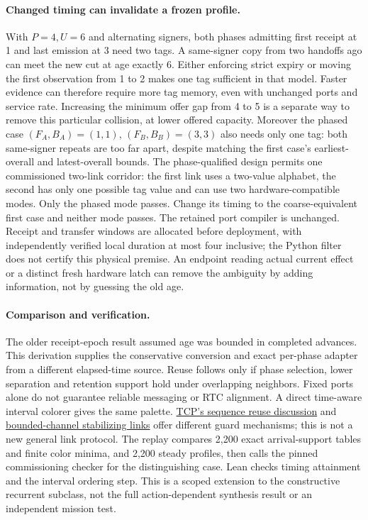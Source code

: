 \documentclass[11pt]{article}
\begin{document}
\paragraph{Changed timing can invalidate a frozen profile.}
With \(P=4,U=6\) and alternating signers, both phases
admitting first receipt at 1 and last emission at 3
need two tags. A same-signer copy from two handoffs ago
can meet the new cut at age exactly 6. Either enforcing
strict expiry or moving the first observation from 1 to
2 makes one tag sufficient in that model. Faster evidence
can therefore require more tag memory, even with unchanged
ports and service rate. Increasing the minimum offer gap from 4 to 5 is a
separate way to remove this particular collision, at lower offered capacity.
Moreover the phased case
\((F_A,B_A)=(1,1)\), \((F_B,B_B)=(3,3)\) also needs
only one tag: both same-signer repeats are too far apart,
despite matching the first case's earliest-overall and
latest-overall bounds. The phase-qualified design permits
one commissioned two-link corridor: the first link uses
a two-value alphabet, the second has only one possible
tag value and can use two hardware-compatible modes.
Only the phased mode passes. Change its timing to the
coarse-equivalent first case and neither mode passes.
The retained port compiler is unchanged. Receipt and
transfer windows are allocated before deployment, with
independently verified local duration at most four inclusive;
the Python filter does not certify this physical premise.
An endpoint reading actual current effect or a distinct
fresh hardware latch can remove the ambiguity by adding
information, not by guessing the old age.

\paragraph{Comparison and verification.}
The older receipt-epoch result assumed age was bounded
in completed advances. This derivation supplies the
conservative conversion and exact per-phase adapter from
a different elapsed-time source. Reuse follows only if
phase selection, lower separation and retention support
hold under overlapping neighbors. Fixed ports alone
do not guarantee reliable messaging or RTC alignment.
A direct time-aware interval colorer gives the same palette.
\href{https://www.rfc-editor.org/rfc/rfc9293.html\#section-3.4.2}{TCP's sequence reuse discussion}
and \href{https://arxiv.org/abs/1011.3632}{bounded-channel stabilizing links}
offer different guard mechanisms; this is not a new
general link protocol. The replay compares 2,200 exact
arrival-support tables and finite color minima, and 2,200
steady profiles, then calls the pinned commissioning
checker for the distinguishing case. Lean checks timing
attainment and the interval ordering step. This is a
scoped extension to the constructive recurrent subclass,
not the full action-dependent synthesis result or an
independent mission test.
\end{document}
